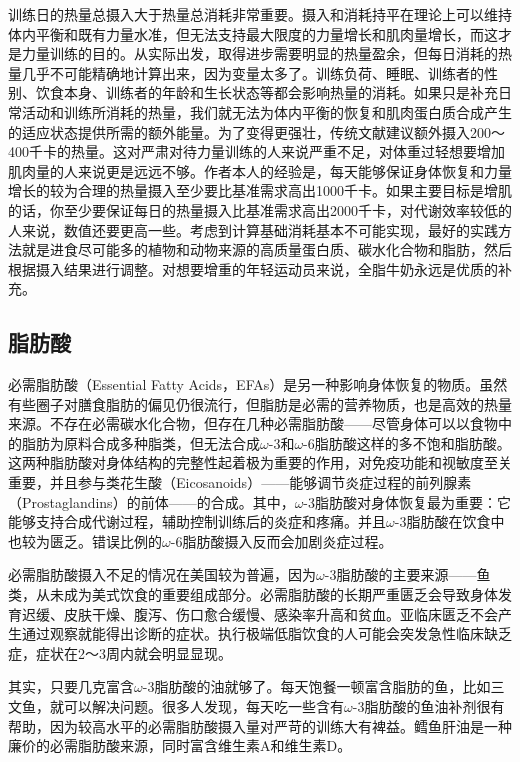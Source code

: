 训练日的热量总摄入大于热量总消耗非常重要。摄入和消耗持平在理论上可以维持体内平衡和既有力量水准，但无法支持最大限度的力量增长和肌肉量增长，而这才是力量训练的目的。从实际出发，取得进步需要明显的热量盈余，但每日消耗的热量几乎不可能精确地计算出来，因为变量太多了。训练负荷、睡眠、训练者的性别、饮食本身、训练者的年龄和生长状态等都会影响热量的消耗。如果只是补充日常活动和训练所消耗的热量，我们就无法为体内平衡的恢复和肌肉蛋白质合成产生的适应状态提供所需的额外能量。为了变得更强壮，传统文献建议额外摄入200～400千卡的热量。这对严肃对待力量训练的人来说严重不足，对体重过轻想要增加肌肉量的人来说更是远远不够。作者本人的经验是，每天能够保证身体恢复和力量增长的较为合理的热量摄入至少要比基准需求高出1000千卡。如果主要目标是增肌的话，你至少要保证每日的热量摄入比基准需求高出2000千卡，对代谢效率较低的人来说，数值还要更高一些。考虑到计算基础消耗基本不可能实现，最好的实践方法就是进食尽可能多的植物和动物来源的高质量蛋白质、碳水化合物和脂肪，然后根据摄入结果进行调整。对想要增重的年轻运动员来说，全脂牛奶永远是优质的补充。

\subsection{脂肪酸}

必需脂肪酸（Essential Fatty Acids，EFAs）是另一种影响身体恢复的物质。虽然有些圈子对膳食脂肪的偏见仍很流行，但脂肪是必需的营养物质，也是高效的热量来源。不存在必需碳水化合物，但存在几种必需脂肪酸——尽管身体可以以食物中的脂肪为原料合成多种脂类，但无法合成$\omega$-3和$\omega$-6脂肪酸这样的多不饱和脂肪酸。这两种脂肪酸对身体结构的完整性起着极为重要的作用，对免疫功能和视敏度至关重要，并且参与类花生酸（Eicosanoids）——能够调节炎症过程的前列腺素（Prostaglandins）的前体——的合成。其中，$\omega$-3脂肪酸对身体恢复最为重要：它能够支持合成代谢过程，辅助控制训练后的炎症和疼痛。并且$\omega$-3脂肪酸在饮食中也较为匮乏。错误比例的$\omega$-6脂肪酸摄入反而会加剧炎症过程。

必需脂肪酸摄入不足的情况在美国较为普遍，因为$\omega$-3脂肪酸的主要来源——鱼类，从未成为美式饮食的重要组成部分。必需脂肪酸的长期严重匮乏会导致身体发育迟缓、皮肤干燥、腹泻、伤口愈合缓慢、感染率升高和贫血。亚临床匮乏不会产生通过观察就能得出诊断的症状。执行极端低脂饮食的人可能会突发急性临床缺乏症，症状在2～3周内就会明显显现。

其实，只要几克富含$\omega$-3脂肪酸的油就够了。每天饱餐一顿富含脂肪的鱼，比如三文鱼，就可以解决问题。很多人发现，每天吃一些含有$\omega$-3脂肪酸的鱼油补剂很有帮助，因为较高水平的必需脂肪酸摄入量对严苛的训练大有裨益。鳕鱼肝油是一种廉价的必需脂肪酸来源，同时富含维生素A和维生素D。

